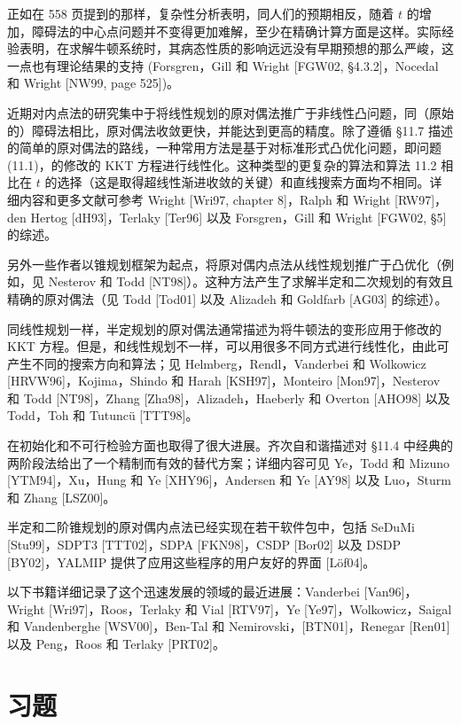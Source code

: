 \documentclass[UTF8, 12pt, fontset=fandol, oneside]{ctexart}
\begin{document}
正如在 558 页提到的那样，复杂性分析表明，同人们的预期相反，随着 $t$ 的增加，障碍法的中心点问题并不变得更加难解，至少在精确计算方面是这样。实际经验表明，在求解牛顿系统时，其病态性质的影响远远没有早期预想的那么严峻，这一点也有理论结果的支持 (Forsgren，Gill 和 Wright [FGW02, \S4.3.2]，Nocedal 和 Wright [NW99, page 525])。

近期对内点法的研究集中于将线性规划的原对偶法推广于非线性凸问题，同（原始的）障碍法相比，原对偶法收敛更快，并能达到更高的精度。除了遵循 \S11.7 描述的简单的原对偶法的路线，一种常用方法是基于对标准形式凸优化问题，即问题 (11.1)，的修改的 KKT 方程进行线性化。这种类型的更复杂的算法和算法 11.2 相比在 $t$ 的选择（这是取得超线性渐进收敛的关键）和直线搜索方面均不相同。详细内容和更多文献可参考 Wright [Wri97, chapter 8]，Ralph 和 Wright [RW97]，den Hertog [dH93]，Terlaky [Ter96] 以及 Forsgren，Gill 和 Wright [FGW02, \S5] 的综述。

另外一些作者以锥规划框架为起点，将原对偶内点法从线性规划推广于凸优化（例如，见 Nesterov 和 Todd [NT98]）。这种方法产生了求解半定和二次规划的有效且精确的原对偶法（见 Todd [Tod01] 以及 Alizadeh 和 Goldfarb [AG03] 的综述）。

同线性规划一样，半定规划的原对偶法通常描述为将牛顿法的变形应用于修改的 KKT 方程。但是，和线性规划不一样，可以用很多不同方式进行线性化，由此可产生不同的搜索方向和算法；见 Helmberg，Rendl，Vanderbei 和 Wolkowicz [HRVW96]，Kojima，Shindo 和 Harah [KSH97]，Monteiro [Mon97]，Nesterov 和 Todd [NT98]，Zhang [Zha98]，Alizadeh，Haeberly 和 Overton [AHO98] 以及 Todd，Toh 和 Tutuncü [TTT98]。

在初始化和不可行检验方面也取得了很大进展。齐次自和谐描述对 \S11.4 中经典的两阶段法给出了一个精制而有效的替代方案；详细内容可见 Ye，Todd 和 Mizuno [YTM94]，Xu，Hung 和 Ye [XHY96]，Andersen 和 Ye [AY98] 以及 Luo，Sturm 和 Zhang [LSZ00]。

半定和二阶锥规划的原对偶内点法已经实现在若干软件包中，包括 SeDuMi [Stu99]，SDPT3 [TTT02]，SDPA [FKN98]，CSDP [Bor02] 以及 DSDP [BY02]，YALMIP 提供了应用这些程序的用户友好的界面 [Löf04]。

以下书籍详细记录了这个迅速发展的领域的最近进展：Vanderbei [Van96]，Wright [Wri97]，Roos，Terlaky 和 Vial [RTV97]，Ye [Ye97]，Wolkowicz，Saigal 和 Vandenberghe [WSV00]，Ben-Tal 和 Nemirovski，[BTN01]，Renegar [Ren01] 以及 Peng，Roos 和 Terlaky [PRT02]。

\section*{习题}
\end{document}

